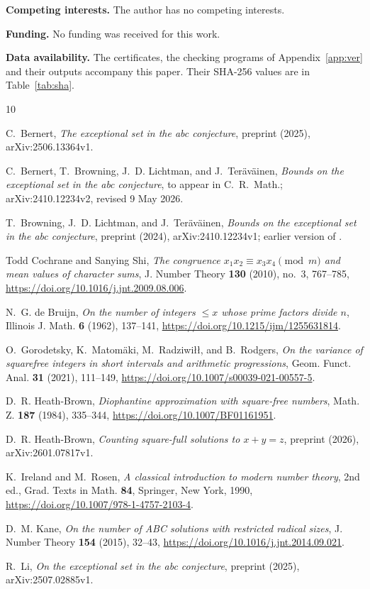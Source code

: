 \documentclass{amsart}
\theoremstyle{definition}
\theoremstyle{plain}
\numberwithin{equation}{section}
\numberwithin{table}{section}
\begin{document}
\textbf{Competing interests.} The author has no competing interests.

\textbf{Funding.} No funding was received for this work.

\textbf{Data availability.} The certificates, the checking programs of
Appendix~\ref{app:ver} and their outputs accompany this paper. Their SHA-256
values are in Table~\ref{tab:sha}.

\begin{thebibliography}{10}

C.~Bernert, \emph{The exceptional set in the abc conjecture}, preprint (2025),
arXiv:2506.13364v1.

C.~Bernert, T.~Browning, J.~D. Lichtman, and J.~Ter\"av\"ainen,
\emph{Bounds on the exceptional set in the abc conjecture}, to appear in
C.~R.~Math.; arXiv:2410.12234v2, revised 9 May 2026.

T.~Browning, J.~D. Lichtman, and J.~Ter\"av\"ainen,
\emph{Bounds on the exceptional set in the abc conjecture}, preprint (2024),
arXiv:2410.12234v1; earlier version of \cite{BBLT}.

Todd Cochrane and Sanying Shi, \emph{The congruence $x_1x_2\equiv x_3x_4\pmod m$
and mean values of character sums}, J. Number Theory \textbf{130} (2010),
no.~3, 767--785,
\url{https://doi.org/10.1016/j.jnt.2009.08.006}.

N.~G. de Bruijn, \emph{On the number of integers $\le x$ whose prime factors
divide $n$}, Illinois J. Math. \textbf{6} (1962), 137--141,
\url{https://doi.org/10.1215/ijm/1255631814}.

O.~Gorodetsky, K.~Matom\"aki, M.~Radziwi\l\l, and B.~Rodgers, \emph{On the
variance of squarefree integers in short intervals and arithmetic
progressions}, Geom. Funct. Anal. \textbf{31} (2021), 111--149,
\url{https://doi.org/10.1007/s00039-021-00557-5}.

D.~R. Heath-Brown, \emph{Diophantine approximation with square-free numbers},
Math. Z. \textbf{187} (1984), 335--344,
\url{https://doi.org/10.1007/BF01161951}.

D.~R. Heath-Brown, \emph{Counting square-full solutions to $x+y=z$},
preprint (2026), arXiv:2601.07817v1.

K.~Ireland and M.~Rosen, \emph{A classical introduction to modern number
theory}, 2nd ed., Grad. Texts in Math. \textbf{84}, Springer, New York,
1990, \url{https://doi.org/10.1007/978-1-4757-2103-4}.

D.~M. Kane, \emph{On the number of ABC solutions with restricted radical sizes},
J. Number Theory \textbf{154} (2015), 32--43,
\url{https://doi.org/10.1016/j.jnt.2014.09.021}.

R.~Li, \emph{On the exceptional set in the abc conjecture}, preprint (2025),
arXiv:2507.02885v1.

\end{thebibliography}
\end{document}

